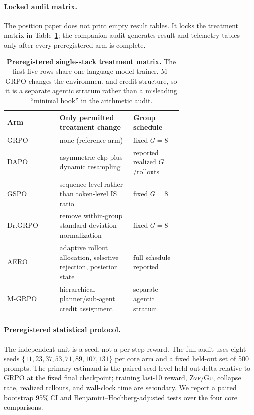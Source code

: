 \documentclass[11pt]{article}
\newcommand{\zvf}{\textsc{Zvf}}
\newcommand{\gu}{\textsc{Gu}}
\begin{document}
\paragraph{Locked audit matrix.}
The position paper does not print empty result tables. It locks the treatment
matrix in Table~\ref{tab:audit-protocol}; the companion audit generates result
and telemetry tables only after every preregistered arm is complete.

\begin{table}[t]
\centering
\caption{\textbf{Preregistered single-stack treatment matrix.} The first five
rows share one language-model trainer. M-GRPO changes the environment and credit
structure, so it is a separate agentic stratum rather than a misleading
``minimal hook'' in the arithmetic audit.}
\label{tab:audit-protocol}
\small
\begin{tabular}{@{}lp{0.42\linewidth}p{0.28\linewidth}@{}}
\toprule
\textbf{Arm} & \textbf{Only permitted treatment change} & \textbf{Group schedule}\\
\midrule
GRPO & none (reference arm) & fixed $G=8$\\
DAPO & asymmetric clip plus dynamic resampling & reported realized $G$/rollouts\\
GSPO & sequence-level rather than token-level IS ratio & fixed $G=8$\\
Dr.GRPO & remove within-group standard-deviation normalization & fixed $G=8$\\
AERO & adaptive rollout allocation, selective rejection, posterior state & full schedule reported\\
M-GRPO & hierarchical planner/sub-agent credit assignment & separate agentic stratum\\
\bottomrule
\end{tabular}
\end{table}

\paragraph{Preregistered statistical protocol.}
The independent unit is a seed, not a per-step reward. The full audit uses
eight seeds $\{11,23,37,53,71,89,107,131\}$ per core arm and a fixed held-out
set of 500 prompts. The primary estimand is the paired seed-level held-out
delta relative to GRPO at the fixed final checkpoint; training last-10 reward,
\zvf{}/\gu{}, collapse rate, realized rollouts, and wall-clock time are
secondary. We report a paired bootstrap 95\% CI and Benjamini--Hochberg-adjusted
tests over the four core comparisons.
\end{document}
